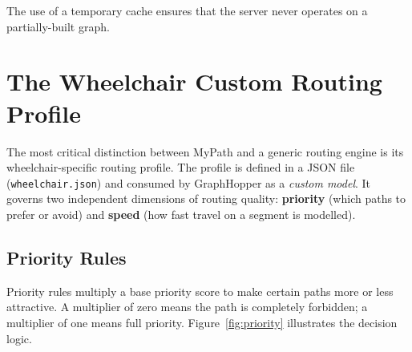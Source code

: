 \documentclass[12pt, a4paper]{report}
\begin{document}
The use of a temporary cache ensures that the server never operates on a partially-built graph.

\section{The Wheelchair Custom Routing Profile}
\label{sec:profile}

The most critical distinction between MyPath and a generic routing engine is its wheelchair-specific routing profile. The profile is defined in a JSON file (\texttt{wheelchair.json}) and consumed by GraphHopper as a \emph{custom model}. It governs two independent dimensions of routing quality: \textbf{priority} (which paths to prefer or avoid) and \textbf{speed} (how fast travel on a segment is modelled).

\subsection{Priority Rules}
\label{subsec:priority}

Priority rules multiply a base priority score to make certain paths more or less attractive. A multiplier of zero means the path is completely forbidden; a multiplier of one means full priority. Figure~\ref{fig:priority} illustrates the decision logic.
\end{document}
